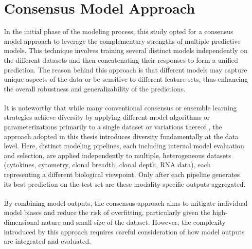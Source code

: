 \documentclass[12pt,a4paper]{report}
\begin{document}
\section{Consensus Model Approach}
\noindent
In the initial phase of the modeling process, this study opted for a consensus model approach to leverage the complementary strengths of multiple predictive models. This technique involves training several distinct models independently on the different datasets and then concatenating their responses to form a unified prediction. The reason behind this approach is that different models may capture unique aspects of the data or be sensitive to different feature sets, thus enhancing the overall robustness and generalizability of the predictions.\\
\\
It is noteworthy that while many conventional consensus or ensemble learning strategies achieve diversity by applying different model algorithms or parameterizations primarily to a single dataset or variations thereof \cite{Rokach2010}, the approach adopted in this thesis introduces diversity fundamentally at the data level. Here, distinct modeling pipelines, each including internal model evaluation and selection, are applied independently to multiple, heterogeneous datasets (cytokines, cytometry, clonal breadth, clonal depth, RNA data), each representing a different biological viewpoint. Only after each pipeline generates its best prediction on the test set are these modality-specific outputs aggregated.\\
\\
By combining model outputs, the consensus approach aims to mitigate individual model biases and reduce the risk of overfitting, particularly given the high-dimensional nature and small size of the dataset. However, the complexity introduced by this approach requires careful consideration of how model outputs are integrated and evaluated.
\end{document}
